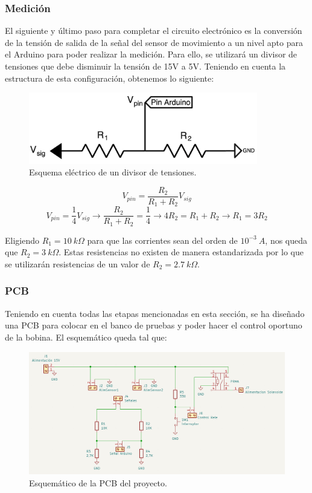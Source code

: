 \subsubsection*{Medición}

El siguiente y último paso para completar el circuito electrónico es la conversión de la tensión de salida de la señal del sensor de movimiento a un nivel apto para el Arduino para poder realizar la medición. Para ello, se utilizará un divisor de tensiones que debe disminuir la tensión de 15V a 5V. Teniendo en cuenta la estructura de esta configuración, obtenemos lo siguiente:

\begin{figure}[H]
    \centering
    \includegraphics[width=10cm]{FigurasMemoria/divisorTensiones.png}
    \caption{Esquema eléctrico de un divisor de tensiones.}
    \label{fig:divisorTensiones} %
\end{figure}
\[
V_{pin}=\frac{R_2}{R_1+R_2}V_{sig}
\]
\[
V_{pin}=\frac{1}{4}V_{sig}\to \frac{R_2}{R_1+R_2}=\frac{1}{4}\to 4R_2=R_1+R_2\to R_1=3R_2
\]

Eligiendo \(R_1=10~k\Omega\) para que las corrientes sean del orden de \(10^{-3}~A\), nos queda que \(R_2=3~k\Omega\). Estas resistencias no existen de manera estandarizada por lo que se utilizarán resistencias de un valor de \(R_2=2.7~k\Omega\).

\newpage
\subsubsection*{PCB}

Teniendo en cuenta todas las etapas mencionadas en esta sección, se ha diseñado una PCB para colocar en el banco de pruebas y poder hacer el control oportuno de la bobina. El esquemático queda tal que:

\begin{figure}[H]
    \centering
    \includegraphics[width=\linewidth]{FigurasMemoria/esquematicoPCB.png}
    \caption{Esquemático de la PCB del proyecto.}
    \label{fig:esquematicoPCB} %
\end{figure}

